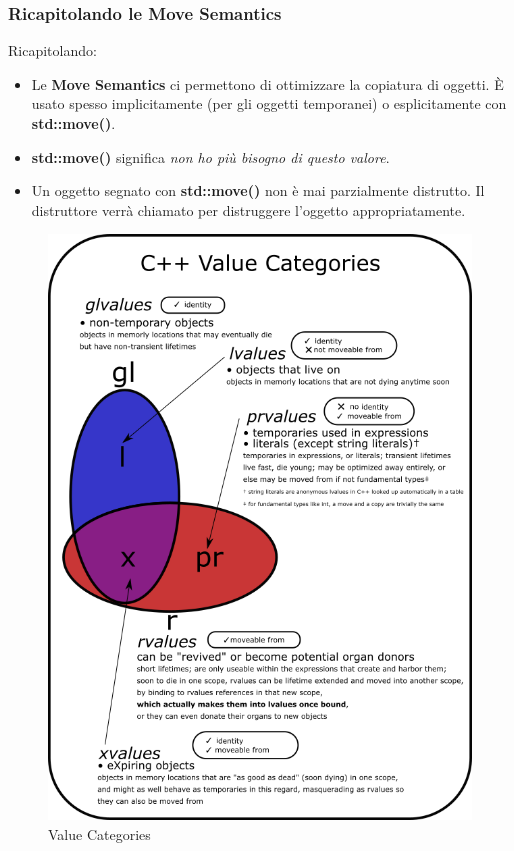 \subsubsection{Ricapitolando le Move Semantics}

\textsf{\small Ricapitolando: }

\begin{itemize}
	\item \textsf{\small Le \textbf{Move Semantics} ci permettono di ottimizzare la copiatura di oggetti. È usato spesso implicitamente (per gli oggetti temporanei) o esplicitamente con \textbf{std::move()}.}
	\item \textsf{\small \textbf{std::move()} significa \emph{non ho più bisogno di questo valore}.}
	\item \textsf{\small Un oggetto segnato con \textbf{std::move()} non è mai parzialmente distrutto. Il distruttore verrà chiamato per distruggere l'oggetto appropriatamente.}
\end{itemize}

\newpage %

\begin{figure}[H]
	\centering
	\includegraphics[width=1\textwidth, height=1\textheight, keepaspectratio]{./imgs/value_categories2.png}
	\caption{Value Categories}
	\label{fig:value_categories2}
\end{figure}

